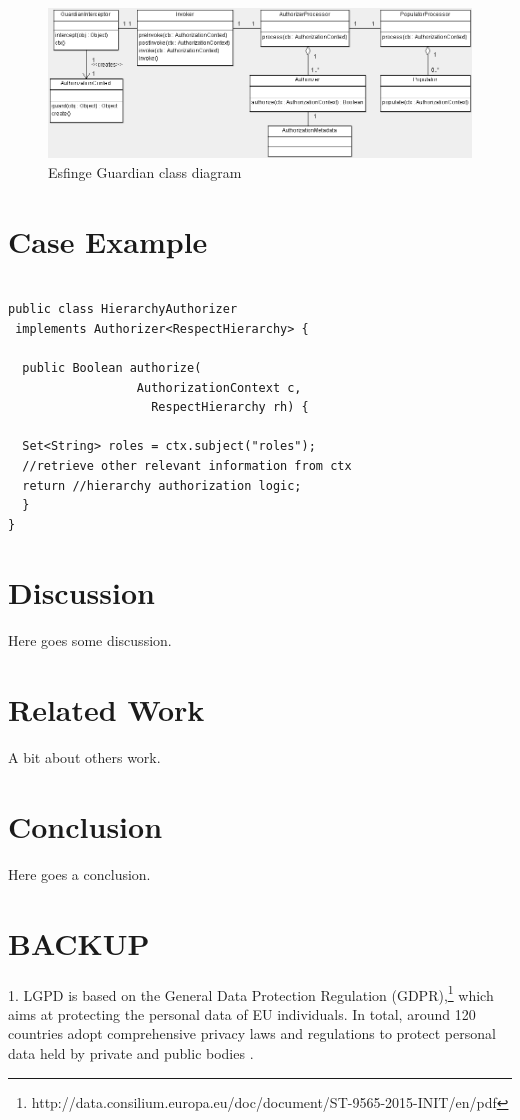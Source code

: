 \documentclass[sigconf]{acmart}
\begin{document}
\begin{figure}
  \centering
  \includegraphics[scale=0.45]{img/guardian-class-diagram.png}
  \caption{Esfinge Guardian class diagram \cite{Silva2013}}
  \label{fig:guardian-class-diagram}
\end{figure}



\section{Case Example}

\begin{lstlisting}

public class HierarchyAuthorizer
 implements Authorizer<RespectHierarchy> {

  public Boolean authorize(
                  AuthorizationContext c,
                    RespectHierarchy rh) {

  Set<String> roles = ctx.subject("roles");
  //retrieve other relevant information from ctx
  return //hierarchy authorization logic;
  }
}

\end{lstlisting}

\section{Discussion}

Here goes some discussion.

\section{Related Work}
A bit about others work.


\section{Conclusion}
Here goes a conclusion.


\section{BACKUP}
1.%
LGPD is based on the General Data Protection Regulation (GDPR),\footnote{http://data.consilium.europa.eu/doc/document/ST-9565-2015-INIT/en/pdf} which aims at protecting the personal data of EU individuals. In total, around 120 countries adopt comprehensive privacy laws and regulations to protect personal data held by private and public bodies \cite{Banisar2011}.
\end{document}

